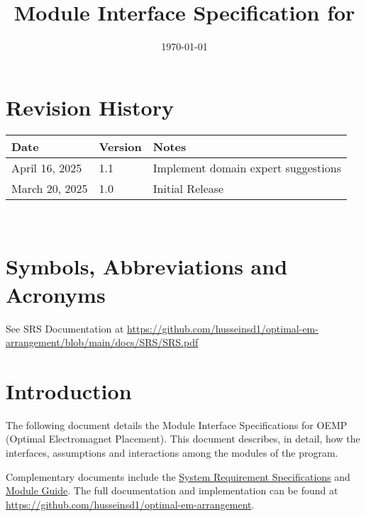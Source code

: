 \documentclass[12pt, titlepage]{article}
\begin{document}
\title{Module Interface Specification for \progname{}}

\author{\authname}

\date{\today}

\maketitle


\section{Revision History}

\begin{tabularx}{\textwidth}{p{3cm}p{2cm}X}
\toprule {\bf Date} & {\bf Version} & {\bf Notes}\\
\midrule
April 16, 2025 & 1.1 & Implement domain expert suggestions\\
\midrule
March 20, 2025 & 1.0 & Initial Release\\
\bottomrule
\end{tabularx}

~\newpage

\section{Symbols, Abbreviations and Acronyms}

See SRS Documentation at \url{https://github.com/husseinsd1/optimal-em-arrangement/blob/main/docs/SRS/SRS.pdf}
\newpage

\tableofcontents

\newpage


\section{Introduction}

The following document details the Module Interface Specifications for
OEMP (Optimal Electromagnet Placement). This document describes, in detail, how the interfaces, assumptions and interactions among the modules of the program. 

Complementary documents include the \href{https://github.com/husseinsd1/optimal-em-arrangement/blob/main/docs/SRS/SRS.pdf}{System Requirement Specifications} and \href{https://github.com/husseinsd1/optimal-em-arrangement/blob/main/docs/Design/SoftArchitecture/MG.pdf}{Module Guide}. The full documentation and implementation can be
found at \url{https://github.com/husseinsd1/optimal-em-arrangement}.
\end{document}
